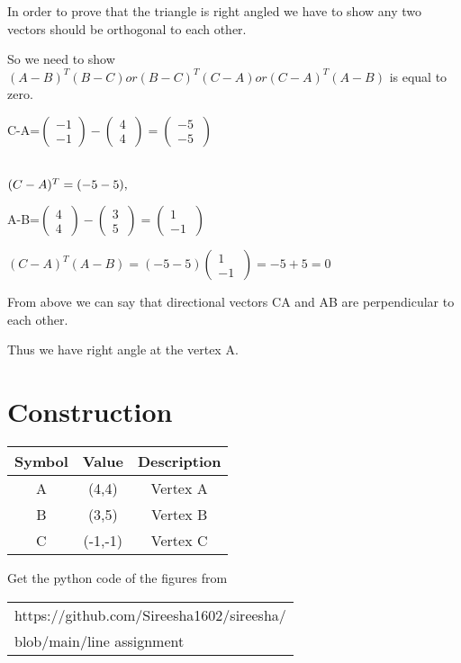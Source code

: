 \documentclass[journal,12pt,twocolumn]{IEEEtran}
\begin{document}
\vspace{0.25cm}
 In order to prove that the triangle is right angled we have to show any two vectors should be orthogonal to each other.
 
\vspace{0.25cm}\raggedright
So we need to show $(A-B)^T(B-C) or (B-C)^T(C-A) or (C-A)^T(A-B) $ is equal to zero.

\vspace{0.5cm}\raggedright
C-A=$\begin{pmatrix}
-1 \\
-1 
\end{pmatrix}
-\begin{pmatrix}
4 \\
4 \
\end{pmatrix}
=\begin{pmatrix}
-5 \\
-5 \
\end{pmatrix}$
\vspace{0.5cm}\raggedright\\
$(C-A)^T=(-5\space -5),$
\vspace{0.5cm}\raggedright
A-B=$\begin{pmatrix}
4 \\
4 \ 
\end{pmatrix}
-\begin{pmatrix}
3 \\
5 \
\end{pmatrix}
=\begin{pmatrix}
1 \\
-1 \
\end{pmatrix}$
\vspace{0.25cm}\raggedright
$(C-A)^T(A-B)=(-5 -5)\begin{pmatrix}
1 \\
-1 \
\end{pmatrix}
=-5+5=0$
\vspace{0.25cm}\raggedright
From above we can say that directional vectors CA and AB are perpendicular to each other.\\
\vspace{0.25cm}\raggedright
Thus we have right angle at the vertex A.


\vspace{0.2cm}
\section*{Construction}
\centering
\vspace{0.2cm}
{
\setlength\extrarowheight{2pt}
\begin{tabular}{|c|c|c|}
	\hline
	\textbf{Symbol}&\textbf{Value}&\textbf{Description}\\
	\hline
	A & (4,4) & Vertex A\\
	\hline
	B & (3,5) & Vertex B\\
	\hline
	C & (-1,-1) & Vertex C\\
	\hline
	
\end{tabular}
}

\vspace{0.6cm}
Get the python code of the figures from
\begin{table}[h]
\large
\centering
\begin{tabular}{|l|}
\hline
https://github.com/Sireesha1602/sireesha/
\\blob/main/line assignment \\
\hline
\end{tabular}

\end{table}
\end{document}
